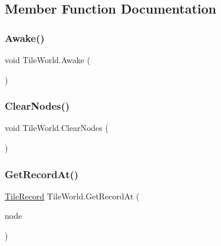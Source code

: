 \subsection{Member Function Documentation}
\mbox{\label{class_tile_world_ac42e3485b2e38601dd47dcb12b5af1d8}} 
\subsubsection{\texorpdfstring{Awake()}{Awake()}}
{\footnotesize\ttfamily void Tile\+World.\+Awake (\begin{DoxyParamCaption}{ }\end{DoxyParamCaption})}

\mbox{\label{class_tile_world_a1888b1fe49ca8b7a58b982cb25ddd7f0}} 
\subsubsection{\texorpdfstring{Clear\+Nodes()}{ClearNodes()}}
{\footnotesize\ttfamily void Tile\+World.\+Clear\+Nodes (\begin{DoxyParamCaption}{ }\end{DoxyParamCaption})}

\mbox{\label{class_tile_world_aeeb99a43018c8bcbc49054e248429291}} 
\subsubsection{\texorpdfstring{Get\+Record\+At()}{GetRecordAt()}}
{\footnotesize\ttfamily \mbox{\hyperlink{struct_tile_record}{Tile\+Record}} Tile\+World.\+Get\+Record\+At (\begin{DoxyParamCaption}\item[{\mbox{\hyperlink{struct_int_point}{Int\+Point}}}]{node }\end{DoxyParamCaption})}

\mbox{\label{class_tile_world_ad236fe1c3f6a9f3bd6f1811962e8d849}} 
